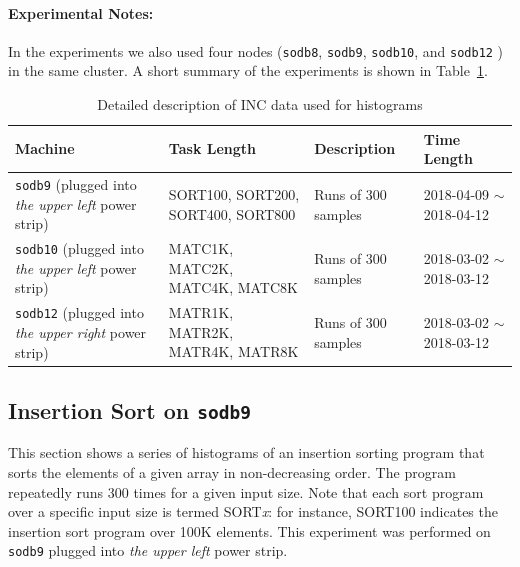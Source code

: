 \documentclass[10pt]{article}
\begin{document}
\paragraph{Experimental Notes:} In the experiments 
we also used four nodes ({\tt sodb8}, {\tt sodb9}, {\tt sodb10}, and {\tt sodb12} ) in the same cluster. 
A short summary of the experiments is shown in Table~\ref{tab:exp_notes}.

\begin{table}[h]
\begin{center}
\begin{tabular}{|p{4cm}|p{3cm}|p{4cm}|p{4cm}|} \hline
Machine & Task Length & Description & Time Length\\ \hline
{\tt sodb9}  (plugged into {\em the upper left} power strip) & SORT100, SORT200, SORT400, SORT800 & Runs of 300 samples & 2018-04-09 $\sim$2018-04-12\\ \hline
{\tt sodb10} (plugged into {\em the upper left} power strip)  & MATC1K, MATC2K, MATC4K, MATC8K & Runs of 300 samples & 2018-03-02 $\sim$2018-03-12 \\ \hline
{\tt sodb12} (plugged into {\em the upper right} power strip) & MATR1K, MATR2K, MATR4K, MATR8K& Runs of 300 samples & 2018-03-02 $\sim$2018-03-12 \\ \hline
\end{tabular}
\end{center}
\vspace{-.2in}
\caption{Detailed description of INC data used for histograms\label{tab:exp_notes}}
\end{table}


\clearpage
\pagebreak

\subsection{Insertion Sort on {\tt sodb9}~\label{sec:new_ins_sort}} 
This section shows a series of histograms of an insertion sorting program that 
sorts the elements of a given array in non-decreasing order. 
The program repeatedly runs 300 times for a given input size. 
Note that each sort program over a specific input size is termed SORT{\it x}: 
for instance, SORT100 indicates the insertion sort program over 100K elements. 
This experiment was performed on {\tt sodb9} plugged into {\em the upper left} power strip.
\end{document}
